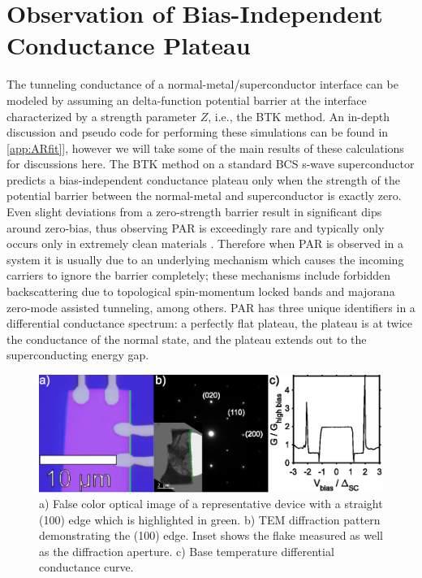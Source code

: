 \section{Observation of Bias-Independent Conductance Plateau}
The tunneling conductance of a normal-metal/superconductor interface can be modeled by assuming an delta-function potential barrier at the interface characterized by a strength parameter $Z$, i.e., the \ac{BTK} method. An in-depth discussion and pseudo code for performing these simulations can be found in \ref{app:ARfit}], however we will take some of the main results of these calculations for discussions here. The \ac{BTK} method on a standard \ac{BCS} s-wave superconductor predicts a bias-independent conductance plateau only when the strength of the potential barrier between the normal-metal and superconductor is exactly zero. Even slight deviations from a zero-strength barrier result in significant dips around zero-bias, thus observing \ac{PAR} is exceedingly rare and typically only occurs only in extremely clean materials . Therefore when \ac{PAR} is observed in a system it is usually due to an underlying mechanism which causes the incoming carriers to ignore the barrier completely; these mechanisms include forbidden backscattering due to topological spin-momentum locked bands and majorana zero-mode assisted tunneling, among others. \ac{PAR} has three unique identifiers in a differential conductance spectrum: a perfectly flat plateau, the plateau is at twice the conductance of the normal state, and the plateau extends out to the superconducting energy gap.\par
\begin{figure}[h]
    \centering
    \includegraphics[width = \textwidth]{Chap4/Figures/DeviceFab.eps}
    \caption{a) False color optical image of a representative device with a straight (100) edge which is highlighted in green. b) \ac{TEM} diffraction pattern demonstrating the (100) edge. Inset shows the flake measured as well as the diffraction aperture. c) Base temperature differential conductance curve.}
    \label{fig:PARDeviceFab}
\end{figure}
